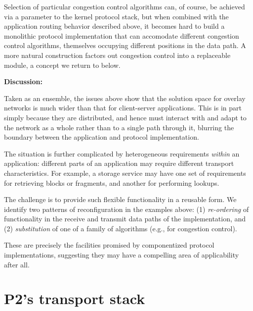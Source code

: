 \documentclass[10pt,twocolumn]{article}
\renewcommand{\subsection}[1]{\vspace{10pt}\noindent\textbf{#1:}\vspace{5pt}}
\newcommand{\note}[1]{}
\begin{document}
Selection of particular congestion
control algorithms can, of course, be achieved via a parameter to the
kernel protocol stack, but when combined with the application
routing behavior described above, it becomes hard to build a
monolithic protocol implementation that can accomodate different
congestion control algorithms, themselves occupying different
positions in the data path.   A more natural construction factors out
congestion control into a replaceable module, a concept we return to
below. 

\subsection{Discussion}

Taken as an ensemble, the issues above show that the solution space
for overlay networks is much wider than that for client-server
applications.  This is in part simply because they are distributed,
and hence must interact with and adapt to the network as a whole
rather than to a single path through it,  blurring the boundary
between the application and protocol implementation.  

The situation is further complicated by heterogeneous requirements
\emph{within} an application: different parts of an
application may require different transport
characteristics. For example, a 
storage service may have one set of requirements for
retrieving blocks or fragments, and another for performing
lookups. 

The challenge is to provide such flexible functionality in a
reusable form.  We identify two patterns of reconfiguration in
the examples above: (1) \emph{re-ordering} of functionality
in the receive and transmit data paths of the implementation, \note{P: What
about the fuzzification of application/transport boundaries, as with the
route flexibility case? is that also reordering or ``spreading''?} and
(2) \emph{substitution} of one of a family of algorithms (e.g., for
congestion control).

These are precisely the facilities promised by componentized protocol
implementations, suggesting they may have a compelling area of
applicability after all.  

\section{P2's transport stack}
\label{sec:p2}
\end{document}
